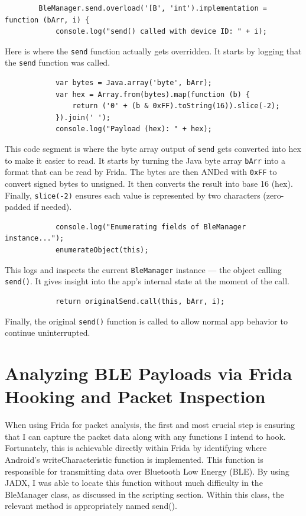	\begin{lstlisting}
		BleManager.send.overload('[B', 'int').implementation = function (bArr, i) {
			console.log("send() called with device ID: " + i);
		\end{lstlisting}
		Here is where the \texttt{send} function actually gets overridden. It starts by logging that the \texttt{send} function was called.
		
		\begin{lstlisting}
			var bytes = Java.array('byte', bArr);
			var hex = Array.from(bytes).map(function (b) {
				return ('0' + (b & 0xFF).toString(16)).slice(-2);
			}).join(' ');
			console.log("Payload (hex): " + hex);
		\end{lstlisting}
		This code segment is where the byte array output of \texttt{send} gets converted into hex to make it easier to read. It starts by turning the Java byte array \texttt{bArr} into a format that can be read by Frida. The bytes are then ANDed with \texttt{0xFF} to convert signed bytes to unsigned. It then converts the result into base 16 (hex). Finally, \texttt{slice(-2)} ensures each value is represented by two characters (zero-padded if needed).
		
		\begin{lstlisting}
			console.log("Enumerating fields of BleManager instance...");
			enumerateObject(this);
		\end{lstlisting}
		This logs and inspects the current \texttt{BleManager} instance — the object calling \texttt{send()}. It gives insight into the app’s internal state at the moment of the call.
		
		\begin{lstlisting}
			return originalSend.call(this, bArr, i);
		\end{lstlisting}
		Finally, the original \texttt{send()} function is called to allow normal app behavior to continue uninterrupted.

\section{Analyzing BLE Payloads via Frida Hooking and Packet Inspection}
When using Frida for packet analysis, the first and most crucial step is ensuring that I can capture the packet data along with any functions I intend to hook. Fortunately, this is achievable directly within Frida by identifying where Android’s writeCharacteristic function is implemented. This function is responsible for transmitting data over Bluetooth Low Energy (BLE). By using JADX, I was able to locate this function without much difficulty in the BleManager class, as discussed in the scripting section. Within this class, the relevant method is appropriately named send().

